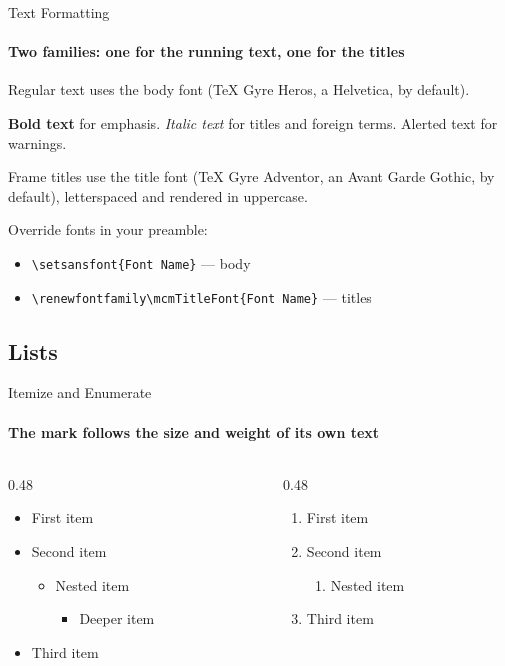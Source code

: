\documentclass[aspectratio=169]{beamer}
\begin{document}
\begin{frame}{Text Formatting}
  \framesubtitle{Two families: one for the running text, one for the titles}
  Regular text uses the body font (TeX Gyre Heros, a Helvetica, by default).

  \vspace{0.5em}
  \textbf{Bold text} for emphasis. \textit{Italic text} for titles
  and foreign terms. \alert{Alerted text} for warnings.

  \vspace{0.5em}
  Frame titles use the title font (TeX Gyre Adventor, an Avant Garde
  Gothic, by default), letterspaced and rendered in uppercase.

  \vspace{0.5em}
  Override fonts in your preamble:
  \begin{itemize}
    \item \texttt{\textbackslash setsansfont\{Font Name\}} — body
    \item \texttt{\textbackslash renewfontfamily\textbackslash mcmTitleFont\{Font Name\}} — titles
  \end{itemize}
\end{frame}

\subsection{Lists}

\begin{frame}{Itemize and Enumerate}
  \framesubtitle{The mark follows the size and weight of its own text}
  \begin{columns}[T]
    \begin{column}{0.48\textwidth}
      \begin{itemize}
        \item First item
        \item Second item
        \begin{itemize}
          \item Nested item
          \begin{itemize}
            \item Deeper item
          \end{itemize}
        \end{itemize}
        \item Third item
      \end{itemize}
    \end{column}
    \begin{column}{0.48\textwidth}
      \begin{enumerate}
        \item First item
        \item Second item
        \begin{enumerate}
          \item Nested item
        \end{enumerate}
        \item Third item
      \end{enumerate}
    \end{column}
  \end{columns}
\end{frame}
\end{document}
